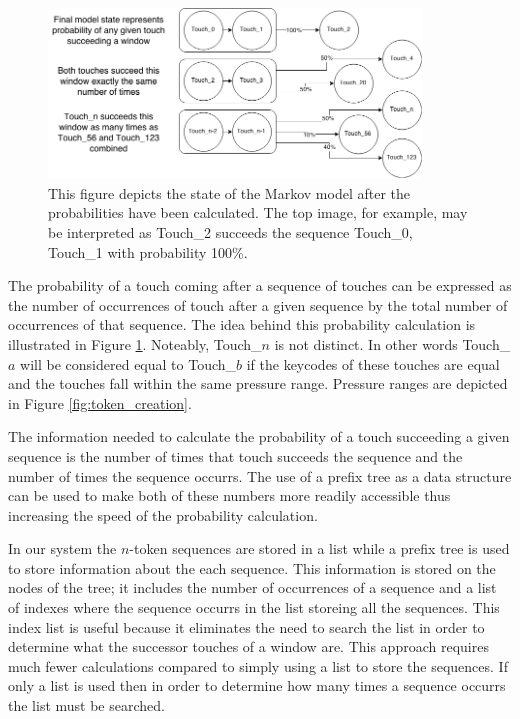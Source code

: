 \documentclass{acm_proc_article-sp}
\begin{document}
\begin{figure}
\centering
\includegraphics[width=3.9in]{final_marcov_model_state.png}
\caption{This figure depicts the state of the Markov model after the probabilities have been calculated. The top image, for example, may be interpreted as Touch\_2 succeeds the sequence Touch\_0, Touch\_1 with probability 100\%.}
\label{fig:final_markov_model_state}
\end{figure}

The probability of a touch coming after a sequence of touches can be expressed as the number of occurrences of touch after a given sequence by the total number of occurrences of that sequence.
The idea behind this probability calculation is illustrated in Figure \ref{fig:final_markov_model_state}.
Noteably, Touch\_$n$ is not distinct. In other words Touch\_$a$ will be considered equal to Touch\_$b$ if the keycodes of these touches are equal and the touches fall within the same pressure range. Pressure ranges are depicted in Figure \ref{fig:token_creation}.

The information needed to calculate the probability of a touch succeeding a given sequence is the number of times that touch succeeds the sequence and the number of times the sequence occurrs.
The use of a prefix tree as a data structure can be used to make both of these numbers more readily accessible thus increasing the speed of the probability calculation.



In our system the $n$-token sequences are stored in a list while a prefix tree is used to store information about the each sequence.
This information is stored on the nodes of the tree; it includes the number of occurrences of a sequence and a list of indexes where the sequence occurrs in the list storeing all the sequences.
This index list is useful because it eliminates the need to search the list in order to determine what the successor touches of a window are.
This approach requires much fewer calculations compared to simply using a list to store the sequences. 
If only a list is used then in order to determine how many times a sequence occurrs the list must be searched.
\end{document}
